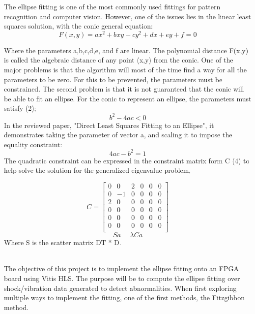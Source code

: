 \documentclass[11pt,a4paper]{article}
\begin{document}
The ellipse fitting is one of the most commonly used fittings for pattern recognition and computer vision. However, one of the issues lies in the linear least squares solution, with the conic general equation:
\begin{equation}
F(x,y) = ax^{2} + bxy + cy^{2} + dx + ey + f = 0   
\end{equation}

Where the parameters a,b,c,d,e, and f are linear. The polynomial distance F(x,y) is called the algebraic distance of any point (x,y) from the conic. One of the major problems is that the algorithm will most of the time find a way for all the parameters to be zero. For this to be prevented, the parameters must be constrained. The second problem is that it is not guaranteed that the conic will be able to fit an ellipse. For the conic to represent an ellipse, the parameters must satisfy (2);
\begin{equation}
    b^{2} - 4ac < 0
\end{equation}
In the reviewed paper, "Direct Least Squares Fitting to an Ellipse", it demonstrates taking the parameter of vector a, and scaling it to impose the equality constraint:
\begin{equation}
    4ac - b^{2} = 1
\end{equation}
The quadratic constraint can be expressed in the constraint matrix form C (4) to help solve the solution for the generalized eigenvalue problem,

\begin{equation}
    C = 
\begin{bmatrix}
0 & 0 & 2 & 0 & 0 & 0 \\
0 & -1 & 0 & 0 & 0 & 0 \\ 
2 & 0 & 0 & 0 & 0 & 0 \\ 
0 & 0 & 0 & 0 & 0 & 0 \\ 
0 & 0 & 0 & 0 & 0 & 0 \\ 
0 & 0 & 0 & 0 & 0 & 0 \\
\end{bmatrix}
\end{equation}
\begin{equation}
    Sa = \lambda Ca
\end{equation}
Where S is the scatter matrix DT * D.

\\The objective of this project is to implement the ellipse fitting onto an FPGA board using Vitis HLS. The purpose will be to compute the ellipse fitting over shock/vibration data generated to detect abnormalities. When first exploring multiple ways to implement the fitting, one of the first methods, the Fitzgibbon method.
\end{document}
